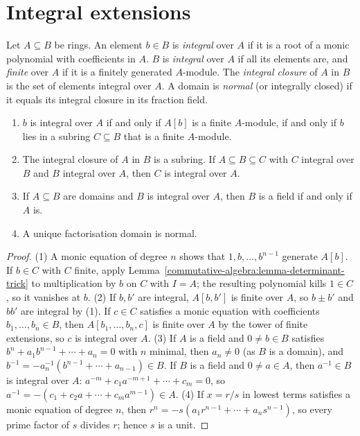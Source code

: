 \section{Integral extensions}\label{commutative-algebra:section-integral}

\begin{definition}\label{commutative-algebra:definition-integral}
Let $A \subseteq B$ be rings. An element $b \in B$ is \emph{integral} over $A$ if it is a root of a monic polynomial with
coefficients in $A$. $B$ is \emph{integral} over $A$ if all its elements are, and \emph{finite} over $A$ if it is a
finitely generated $A$-module. The \emph{integral closure} of $A$ in $B$ is the set of elements integral over $A$. A
domain is \emph{normal} (or integrally closed) if it equals its integral closure in its fraction field.
\end{definition}

\begin{proposition}\label{commutative-algebra:proposition-integral}
\begin{enumerate}
\item $b$ is integral over $A$ if and only if $A[b]$ is a finite $A$-module, if and only if $b$ lies in a subring
$C \subseteq B$ that is a finite $A$-module.
\item The integral closure of $A$ in $B$ is a subring. If $A \subseteq B \subseteq C$ with $C$ integral over $B$ and $B$ integral over
$A$, then $C$ is integral over $A$.
\item If $A \subseteq B$ are domains and $B$ is integral over $A$, then $B$ is a field if and only if $A$ is.
\item A unique factorisation domain is normal.
\end{enumerate}
\end{proposition}

\begin{proof}
(1) A monic equation of degree $n$ shows that $1, b, \ldots, b^{n-1}$ generate $A[b]$. If $b \in C$ with $C$ finite, apply
Lemma~\ref{commutative-algebra:lemma-determinant-trick} to multiplication by $b$ on $C$ with $I = A$; the resulting
polynomial kills $1 \in C$, so it vanishes at $b$.
(2) If $b, b'$ are integral, $A[b, b']$ is finite over $A$, so $b \pm b'$ and $bb'$ are integral by (1). If $c \in C$ satisfies a
monic equation with coefficients $b_1, \ldots, b_n \in B$, then $A[b_1, \ldots, b_n, c]$ is finite over $A$ by the tower
of finite extensions, so $c$ is integral over $A$.
(3) If $A$ is a field and $0 \neq b \in B$ satisfies $b^n + a_1b^{n-1} + \cdots + a_n = 0$ with $n$ minimal, then $a_n \neq 0$ (as
$B$ is a domain), and $b^{-1} = -a_n^{-1}(b^{n-1} + \cdots + a_{n-1}) \in B$. If $B$ is a field and $0 \neq a \in A$, then $a^{-1} \in B$ is
integral over $A$: $a^{-m} + c_1a^{-m+1} + \cdots + c_m = 0$, so $a^{-1} = -(c_1 + c_2a + \cdots + c_ma^{m-1}) \in A$.
(4) If $x = r/s$ in lowest terms satisfies a monic equation of degree $n$, then
$r^n = -s(a_1r^{n-1} + \cdots + a_ns^{n-1})$, so every prime factor of $s$ divides $r$; hence $s$ is a unit.
\end{proof}

